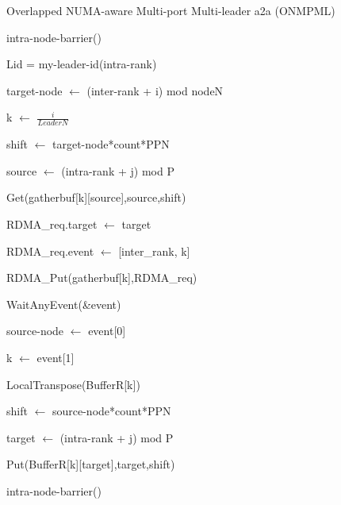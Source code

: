 \begin{algorithm}
	\caption{Overlapped NUMA-aware Multi-port Multi-leader a2a (ONMPML)}\label{OverlapedMulti-leader-based-a2a}
	\SetAlgoLined

	{
		intra-node-barrier()
		
		{
			Lid = my-leader-id(intra-rank)

			{
				target-node $\leftarrow$ (inter-rank + i) mod nodeN

				k $\leftarrow$ $\frac{i}{LeaderN}$

				shift $\leftarrow$ target-node*count*PPN

				{
					source $\leftarrow$ (intra-rank + j) mod P

					Get(gatherbuf[k][source],source,shift)
				}

				RDMA\_req.target $\leftarrow$ target

				RDMA\_req.event $\leftarrow$ [inter\_rank, k]

				RDMA\_Put(gatherbuf[k],RDMA\_req)
			}
			{
				WaitAnyEvent(\&event)

				source-node $\leftarrow$ event[0]

				k $\leftarrow$ event[1]

				LocalTranspose(BufferR[k])


				shift $\leftarrow$ source-node*count*PPN

				{
					target $\leftarrow$ (intra-rank + j) mod P

					Put(BufferR[k][target],target,shift)
				}


			}
		}
		
		intra-node-barrier()
	}
\end{algorithm}


